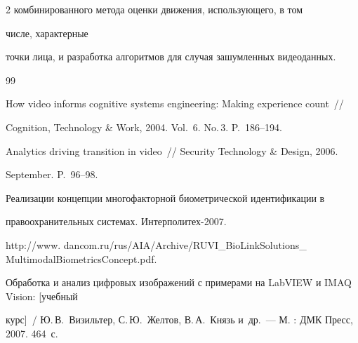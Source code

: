 \begin{multicols}{2}
комбинированного метода оценки движения, использующего, в том\linebreak


 чис\-ле, характерные


точки лица, и разработка алгоритмов для случая зашумленных видеоданных.








     {\small\frenchspacing


{%




\begin{thebibliography}{99}









How video informs cognitive systems engineering: Making experience count~//


Cognition, Technology \& Work, 2004. Vol.~6. No.\,3. P.~186--194.









Analytics driving transition in video~// Security Technology \& Design, 2006.


September. P.~96--98.









Реализации концепции многофак\-тор\-ной биометрической идентификации в


пра\-во\-ох\-ра\-ни\-тельных системах. Интерполитех-2007.


{\sf http://www. dancom.ru/rus/AIA/Archive/RUVI\_BioLinkSolutions\_ MultimodalBiometricsConcept.pdf}.







Обработка и анализ цифровых изображений с примерами на LabVIEW и IMAQ Vision: [учебный


курс]~/ Ю.\,В.~Визильтер, С.\,Ю.~Желтов, В.\,А.~Князь и~др.~--- М. : ДМК Пресс, 2007.  464~с.









\end{thebibliography}}}
\end{multicols}
